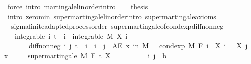 \begin{isabellebody}
\ {\isacharparenleft}{\kern0pt}force\ intro{\isacharcolon}{\kern0pt}\ martingale{\isacharunderscore}{\kern0pt}linorder{\isachardot}{\kern0pt}intro{\isacharparenright}{\kern0pt}\isanewline
\ \ \isamarkupfalse%
\ {\isacharquery}{\kern0pt}thesis\ \isamarkupfalse%
\ {\isacharparenleft}{\kern0pt}intro\ zero{\isachardot}{\kern0pt}min\ supermartingale{\isacharunderscore}{\kern0pt}linorder{\isachardot}{\kern0pt}intro\ supermartingale{\isacharunderscore}{\kern0pt}axioms{\isacharparenright}{\kern0pt}\isanewline
{}\isamarkupfalse%
%
\endisatagproof
{\isafoldproof}%
%
\isadelimproof
\isanewline
%
\endisadelimproof
\isanewline
{}\isamarkupfalse%
\isanewline
\isanewline
{}\isamarkupfalse%
\ {\isacharparenleft}{\kern0pt}\ sigma{\isacharunderscore}{\kern0pt}finite{\isacharunderscore}{\kern0pt}adapted{\isacharunderscore}{\kern0pt}process{\isacharunderscore}{\kern0pt}order{\isacharparenright}{\kern0pt}\ supermartingale{\isacharunderscore}{\kern0pt}of{\isacharunderscore}{\kern0pt}cond{\isacharunderscore}{\kern0pt}exp{\isacharunderscore}{\kern0pt}diff{\isacharunderscore}{\kern0pt}nonneg{\isacharcolon}{\kern0pt}\ \isanewline
\ \ \ integrable{\isacharcolon}{\kern0pt}\ {\isachardoublequoteopen}{\isasymAnd}i{\isachardot}{\kern0pt}\ t\ {\isasymle}\ i\ {\isasymLongrightarrow}\ integrable\ M\ {\isacharparenleft}{\kern0pt}X\ i{\isacharparenright}{\kern0pt}{\isachardoublequoteclose}\ \isanewline
\ \ \ \ \ \ \ diff{\isacharunderscore}{\kern0pt}nonneg{\isacharcolon}{\kern0pt}\ {\isachardoublequoteopen}{\isasymAnd}i\ j{\isachardot}{\kern0pt}\ t\ {\isasymle}\ i\ {\isasymLongrightarrow}\ i\ {\isasymle}\ j\ {\isasymLongrightarrow}\ AE\ x\ in\ M{\isachardot}{\kern0pt}\ {}\ {\isasymle}\ cond{\isacharunderscore}{\kern0pt}exp\ M\ {\isacharparenleft}{\kern0pt}F\ i{\isacharparenright}{\kern0pt}\ {\isacharparenleft}{\kern0pt}{\isasymlambda}{\isasymxi}{\isachardot}{\kern0pt}\ X\ i\ {\isasymxi}\ {\isacharminus}{\kern0pt}\ X\ j\ {\isasymxi}{\isacharparenright}{\kern0pt}\ x{\isachardoublequoteclose}\isanewline
\ \ \ \ \ {\isachardoublequoteopen}supermartingale\ M\ F\ t\ X{\isachardoublequoteclose}\isanewline
%
\isadelimproof
%
\endisadelimproof
%
\isatagproof
{}\isamarkupfalse%
\ \isanewline
\ \ \isacommand{{\isacharbraceleft}{\kern0pt}}\isamarkupfalse%
\isanewline
\ \ \ \ \isamarkupfalse%
\ i\ j\ {\isacharcolon}{\kern0pt}{\isacharcolon}{\kern0pt}\ {\isacharprime}{\kern0pt}b\ \isamarkupfalse%

\end{isabellebody}
